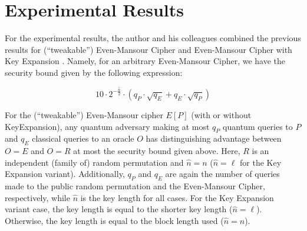 \documentclass[12pt]{article}
\begin{document}
    
    \section{Experimental Results}
    \label{sec:experimental-results}

    For the experimental results, the author and his colleagues combined the previous results for (``tweakable'') Even-Mansour Cipher and Even-Mansour Cipher with Key Expansion \cite{alagic-et-al:post-quantum-security-tweakable-even-mansour-applications:2022:03-2024}. Namely, for an arbitrary Even-Mansour Cipher, we have the security bound given by the following expression:

    $$ 10 \cdot {2}^{-\frac{\hat{n}}{2}} \cdot \left( {q}_{P} \cdot \sqrt{{q}_{E}} + {q}_{E} \cdot \sqrt{{q}_{P}} \right) $$

    \noindent For the (``tweakable'') Even-Mansour cipher $E[P]$ (with or without Key\break Expansion), any quantum adversary making at most ${q}_{P}$ quantum queries to $P$ and ${q}_{E}$ classical queries to an oracle $O$ has distinguishing advantage between $O = E$ and $O = R$ at most the security bound given above. Here, $R$ is an independent (family of) random permutation and $\hat{n} = n$ ($\hat{n} = \ell$ for the Key Expansion variant). Additionally, ${q}_{P}$ and ${q}_{E}$ are again the number of queries made to the public random permutation and the Even-Mansour Cipher, respectively, while $\hat{n}$ is the key length for all cases. For the Key Expansion variant case, the key length is equal to the shorter key length ($\hat{n} = \ell$). Otherwise, the key length is equal to the block length used ($\hat{n} = n$).
    
\end{document}
